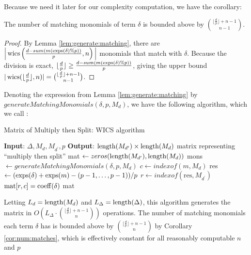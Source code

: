 Because we need it later for our complexity computation, we have the corollary:

\begin{cor}
    \label{cor:num:matches}
    The number of matching monomials of term $\delta$ is 
    bounded above by $\binom{\lfloor \frac{d}{p} \rfloor + n - 1}{n - 1}$.
\end{cor}

\begin{proof}
    By Lemma \ref{lem:generate:matching}, there are 
    $\Big |\operatorname{wics} \left(\frac{d - sum(m(\operatorname{exps}(\delta) \% p))}{p}, n \right) \Big |$ 
    monomials that match with $\delta$.
    Because the division is exact, 
    $\lfloor \frac{d}{p} \rfloor \geq \frac{d - sum(m(\operatorname{exps}(\delta) \% p))}{p}$,
    giving the upper bound 
    $|\operatorname{wics}(\lfloor \frac{d}{p} \rfloor, n)| = \binom{\lfloor \frac{d}{p} \rfloor + n - 1}{n - 1}$.
\end{proof}

Denoting the expression from Lemma \ref{lem:generate:matching} 
by $generateMatchingMonomials(\delta, p, M_d)$, we have
the following algorithm, which we call \wicsalg:

\begin{algorithm}[H]
    \caption{Matrix of Multiply then Split: WICS algorithm}
    \label{alg:matrix:WICS}
    \begin{algorithmic}[1]
    \State \textbf{Input}: $\Delta, M_{d}, M_{d^{\prime}}, p$
    \State \textbf{Output}: $\operatorname{length}(M_{d^{\prime}}) \times \operatorname{length}(M_{d})$ matrix representing ``multiply then split''
    \State mat $\gets zeros(\operatorname{length}(M_{d^{\prime}}), \operatorname{length}(M_{d}))$
    \For{$\delta \in \Delta$}
        \State mons $\gets generateMatchingMonomials(\delta, p, M_{d})$
		    \State $c \gets indexof(m,M_{d})$
			\State res $\gets (\operatorname{exps}(\delta) + \operatorname{exps}(m) - (p-1, \ldots, p-1)) / p$
			\State $r \gets indexof(\text{res},M_{d^{\prime}})$
            \State $\text{mat}[r, c] = \operatorname{coeff}(\delta)$
        \EndFor
    \EndFor
    \State \Return mat
    \end{algorithmic}
\end{algorithm}

Letting $L_{d} = \operatorname{length}(M_d)$ and 
$L_{\Delta} = \operatorname{length}(\Delta)$, this algorithm 
generates the matrix in 
$O \left( L_{\Delta} \cdot \binom{\lfloor \frac{d}{p} \rfloor + n - 1}{n} \right)$ operations.
The number of matching monomials each term $\delta$ 
has is bounded above by $\binom{\lfloor \frac{d}{p} \rfloor + n - 1}{n}$ 
by Corollary \ref{cor:num:matches}, which is 
effectively constant for all reasonably computable $n$ and $p$


